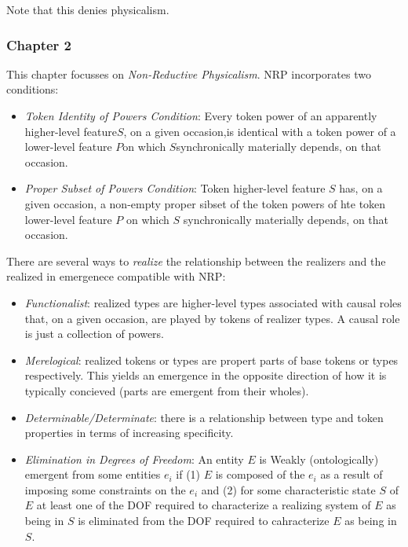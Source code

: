 \documentclass{article}
\newcommand{\ti}[1]{\textit{#1}}
\begin{document}
Note that this denies physicalism.

\subsubsection*{Chapter 2}

This chapter focusses on \ti{Non-Reductive Physicalism}. NRP incorporates two conditions:

\begin{itemize}
    \item \ti{Token Identity of Powers Condition}: Every token power of an apparently higher-level feature​ $S$​, on a given occasion,is identical with a token power of a lower-level feature $P$​ ​on which $S$​ ​synchronically materially depends, on that occasion.
    \item \ti{Proper Subset of Powers Condition}: Token higher-level feature $S$ has, on a given occasion, a non-empty proper sibset of the token powers of hte token lower-level feature $P$ on which $S$ synchronically materially depends, on that occasion.
\end{itemize}

There are several ways to \ti{realize} the relationship between the realizers and the realized in emergenece compatible with NRP:

\begin{itemize}
    \item \ti{Functionalist}: realized types are higher-level types associated with causal roles that, on a given occasion, are played by tokens of realizer types. A causal role is just a collection of powers.
    \item \ti{Merelogical}: realized tokens or types are propert parts of base tokens or types respectively. This yields an emergence in the opposite direction of how it is typically concieved (parts are emergent from their wholes).
    \item \ti{Determinable/Determinate}: there is a relationship between type and token properties in terms of increasing specificity.
    \item \ti{Elimination in Degrees of Freedom}: An entity $E$ is Weakly (ontologically) emergent from some entities $e_i$ if (1) $E$ is composed of the $e_i$ as a result of imposing some constraints on the $e_i$ and (2) for some characteristic state $S$ of $E$ at least one of the DOF required to characterize a realizing system of $E$ as being in $S$ is eliminated from the DOF required to cahracterize $E$ as being in $S$.
\end{itemize}
\end{document}
